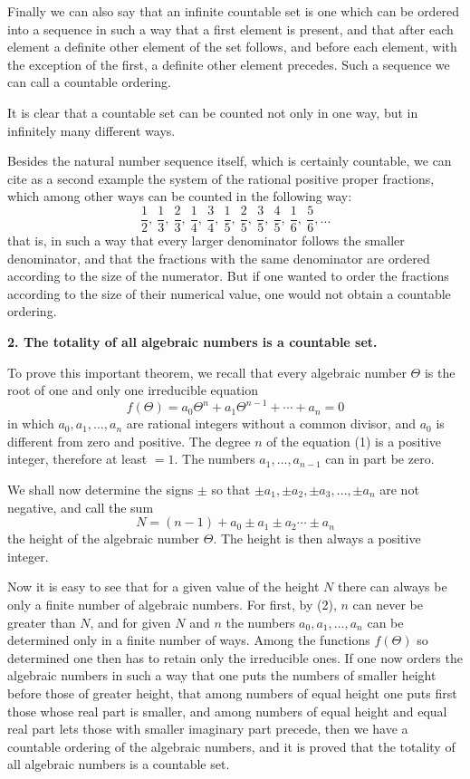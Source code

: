 \documentclass[11pt]{article}
\begin{document}
Finally we can also say that an infinite countable set is one which can be ordered into a sequence in such a way that a first element is present, and that after each element a definite other element of the set follows, and before each element, with the exception of the first, a definite other element precedes. Such a sequence we can call a countable ordering.

It is clear that a countable set can be counted not only in one way, but in infinitely many different ways.

Besides the natural number sequence itself, which is certainly countable, we can cite as a second example the system of the rational positive proper fractions, which among other ways can be counted in the following way:
\[
\frac12,\ \frac13,\ \frac23,\ \frac14,\ \frac34,\ \frac15,\ \frac25,\ \frac35,\ \frac45,\ \frac16,\ \frac56,\ldots
\]
that is, in such a way that every larger denominator follows the smaller denominator, and that the fractions with the same denominator are ordered according to the size of the numerator. But if one wanted to order the fractions according to the size of their numerical value, one would not obtain a countable ordering.

\textbf{2. The totality of all algebraic numbers is a countable set.}

To prove this important theorem, we recall that every algebraic number $\Theta$ is the root of one and only one irreducible equation
\begin{equation}\tag{1}
f(\Theta)=a_0\Theta^n+a_1\Theta^{n-1}+\cdots+a_n=0
\end{equation}
in which $a_0,a_1,\ldots,a_n$ are rational integers without a common divisor, and $a_0$ is different from zero and positive. The degree $n$ of the equation (1) is a positive integer, therefore at least $=1$. The numbers $a_1,\ldots,a_{n-1}$ can in part be zero.

We shall now determine the signs $\pm$ so that $\pm a_1,\pm a_2,\pm a_3,\ldots,\pm a_n$ are not negative, and call the sum
\begin{equation}\tag{2}
N=(n-1)+a_0\pm a_1\pm a_2\cdots\pm a_n
\end{equation}
the height of the algebraic number $\Theta$. The height is then always a positive integer.

Now it is easy to see that for a given value of the height $N$ there can always be only a finite number of algebraic numbers. For first, by (2), $n$ can never be greater than $N$, and for given $N$ and $n$ the numbers $a_0,a_1,\ldots,a_n$ can be determined only in a finite number of ways. Among the functions $f(\Theta)$ so determined one then has to retain only the irreducible ones. If one now orders the algebraic numbers in such a way that one puts the numbers of smaller height before those of greater height, that among numbers of equal height one puts first those whose real part is smaller, and among numbers of equal height and equal real part lets those with smaller imaginary part precede, then we have a countable ordering of the algebraic numbers, and it is proved that the totality of all algebraic numbers is a countable set.
\end{document}

